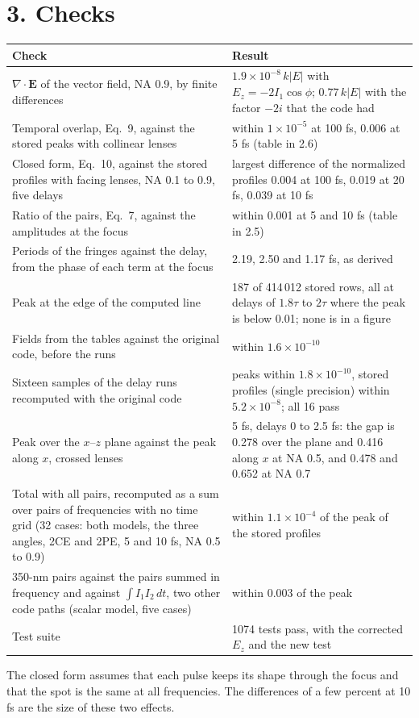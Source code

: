 \documentclass[10pt]{article}
\begin{document}
\section*{3. Checks}
\begin{center}\small\begin{tabular}{p{7.4cm}p{8.6cm}}\toprule
Check & Result\\\midrule
$\nabla\cdot\mathbf{E}$ of the vector field, NA 0.9, by finite differences & $1.9\times10^{-8}\,k|E|$ with
$E_z = -2I_1\cos\phi$; $0.77\,k|E|$ with the factor $-2i$ that the code had\\
Temporal overlap, Eq.~9, against the stored peaks with collinear lenses & within $1\times10^{-5}$ at 100 fs, 0.006 at
5 fs (table in 2.6)\\
Closed form, Eq.~10, against the stored profiles with facing lenses, NA 0.1 to 0.9, five delays & largest
difference of the normalized profiles 0.004 at 100 fs, 0.019 at 20 fs, 0.039 at 10 fs\\
Ratio of the pairs, Eq.~7, against the amplitudes at the focus & within 0.001 at 5 and 10 fs (table in 2.5)\\
Periods of the fringes against the delay, from the phase of each term at the focus & 2.19, 2.50 and 1.17 fs, as
derived\\
Peak at the edge of the computed line & 187 of 414\,012 stored rows, all at delays of $1.8\tau$ to $2\tau$ where
the peak is below 0.01; none is in a figure\\
Fields from the tables against the original code, before the runs & within $1.6\times10^{-10}$\\
Sixteen samples of the delay runs recomputed with the original code & peaks within $1.8\times10^{-10}$, stored profiles (single precision) within $5.2\times10^{-8}$; all 16 pass\\
Peak over the $x$--$z$ plane against the peak along $x$, crossed lenses & 5 fs, delays 0 to 2.5 fs: the gap is 0.278 over the plane and 0.416 along $x$ at NA 0.5, and 0.478 and 0.652 at NA 0.7\\
Total with all pairs, recomputed as a sum over pairs of frequencies with no time grid (32 cases: both models, the
three angles, 2CE and 2PE, 5 and 10 fs, NA 0.5 to 0.9) & within $1.1\times10^{-4}$ of the peak of the stored profiles\\
350-nm pairs against the pairs summed in frequency and against $\int I_1I_2\,dt$, two other code paths (scalar
model, five cases) & within 0.003 of the peak\\
Test suite & 1074 tests pass, with the corrected $E_z$ and the new test\\\bottomrule\end{tabular}\end{center}
The closed form assumes that each pulse keeps its shape through the focus and that the spot is the same at all
frequencies. The differences of a few percent at 10 fs are the size of these two effects.
\end{document}
